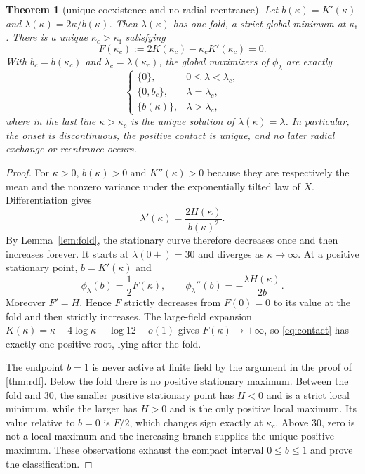 \documentclass[11pt,a4paper]{article}
\newtheorem{theorem}{Theorem}[section]
\begin{document}
\begin{theorem}[unique coexistence and no radial reentrance]\label{thm:phase}
Let $b(\kappa)=K'(\kappa)$ and $\lambda(\kappa)=2\kappa/b(\kappa)$.  Then $\lambda(\kappa)$ has one fold, a strict global minimum at $\kappa_{\mathrm f}$.  There is a unique $\kappa_c>\kappa_{\mathrm f}$ satisfying
\begin{equation}\label{eq:contact}
F(\kappa_c):=2K(\kappa_c)-\kappa_cK'(\kappa_c)=0.
\end{equation}
With $b_c=b(\kappa_c)$ and $\lambda_c=\lambda(\kappa_c)$, the global maximizers of $\phi_\lambda$ are exactly
\[
\begin{cases}
\{0\},&0\le\lambda<\lambda_c,\\
\{0,b_c\},&\lambda=\lambda_c,\\
\{b(\kappa)\},&\lambda>\lambda_c,
\end{cases}
\]
where in the last line $\kappa>\kappa_c$ is the unique solution of $\lambda(\kappa)=\lambda$.  In particular, the onset is discontinuous, the positive contact is unique, and no later radial exchange or reentrance occurs.
\end{theorem}

\begin{proof}
For $\kappa>0$, $b(\kappa)>0$ and $K''(\kappa)>0$ because they are respectively the mean and the nonzero variance under the exponentially tilted law of $X$.  Differentiation gives
\[
\lambda'(\kappa)=\frac{2H(\kappa)}{b(\kappa)^2}.
\]
By Lemma~\ref{lem:fold}, the stationary curve therefore decreases once and then increases forever.  It starts at $\lambda(0+)=30$ and diverges as $\kappa\to\infty$.  At a positive stationary point, $b=K'(\kappa)$ and
\begin{equation}\label{eq:stationaryvalue}
\phi_\lambda(b)=\frac12F(\kappa),\qquad
\phi_\lambda''(b)=-\frac{\lambda H(\kappa)}{2b}.
\end{equation}
Moreover $F'=H$.  Hence $F$ strictly decreases from $F(0)=0$ to its value at the fold and then strictly increases.  The large-field expansion $K(\kappa)=\kappa-4\log\kappa+\log12+o(1)$ gives $F(\kappa)\to+\infty$, so \cref{eq:contact} has exactly one positive root, lying after the fold.

The endpoint $b=1$ is never active at finite field by the argument in the proof of \cref{thm:rdf}.  Below the fold there is no positive stationary maximum.  Between the fold and $30$, the smaller positive stationary point has $H<0$ and is a strict local minimum, while the larger has $H>0$ and is the only positive local maximum.  Its value relative to $b=0$ is $F/2$, which changes sign exactly at $\kappa_c$.  Above $30$, zero is not a local maximum and the increasing branch supplies the unique positive maximum.  These observations exhaust the compact interval $0\le b\le1$ and prove the classification.
\end{proof}
\end{document}
